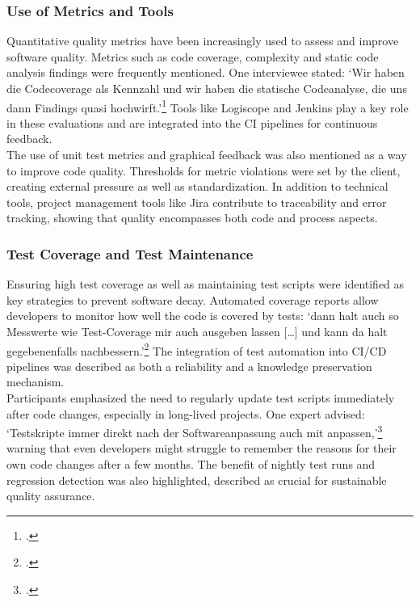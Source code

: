 \subsubsection{Use of Metrics and Tools}
Quantitative quality metrics have been increasingly used to assess and improve software quality. Metrics such as code coverage, complexity and static code analysis findings were frequently mentioned. One interviewee stated: `Wir haben die Codecoverage als Kennzahl und wir haben die statische Codeanalyse,
die uns dann Findings quasi hochwirft.'\footcite{interview3} Tools like Logiscope and Jenkins play a key role in these evaluations and are integrated into the CI pipelines for continuous feedback.\\
The use of unit test metrics and graphical feedback was also mentioned as a way to improve code quality. Thresholds for metric violations were set by the client, creating external pressure as well as standardization. In addition to technical tools, project management tools like Jira contribute to traceability and error tracking,
showing that quality encompasses both code and process aspects.\\

\subsubsection{Test Coverage and Test Maintenance}
Ensuring high test coverage as well as maintaining test scripts were identified as key strategies to prevent software decay. Automated coverage reports allow developers to monitor how well the code is covered by tests: `dann halt auch so Messwerte wie Test-Coverage mir auch ausgeben lassen [\ldots] und kann da halt gegebenenfalls nachbessern.'\footcite{interview3}
The integration of test automation into CI/CD pipelines was described as both a reliability and a knowledge preservation mechanism.\\
Participants emphasized the need to regularly update test scripts immediately after code changes, especially in long-lived projects. One expert advised: `Testskripte immer direkt nach der Softwareanpassung auch mit anpassen,'\footcite{interview1} warning that even developers might struggle to remember the reasons for their own code changes after a few months.
The benefit of nightly test runs and regression detection was also highlighted, described as crucial for sustainable quality assurance.\\

